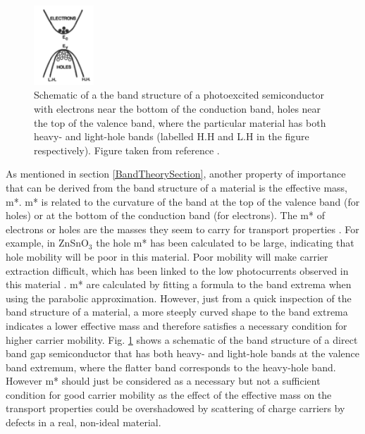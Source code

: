 \documentclass[11pt, twoside]{report}
\begin{document}
\begin{figure}[h!]
  \centering
    \includegraphics[width=0.2\textwidth]{figures/heavy_holes.png}
    \caption{Schematic of a the band structure of a photoexcited semiconductor with electrons near the bottom of the conduction band, holes near the top of the valence band, where the particular material has both heavy- and light-hole bands (labelled H.H and L.H in the figure respectively). Figure taken from reference .}
  \label{heavy_holes}
\end{figure}

As mentioned in section \ref{BandTheorySection}, another property of importance that can be derived from the band structure of a material is the effective mass, m*. m* is related to the curvature of the band at the top of the valence band (for holes) or at the bottom of the conduction band (for electrons). The m* of electrons or holes are the masses they seem to carry for transport properties \cite{dielectric_const1}. For example, in ZnSnO$_3$ the hole m* has been calculated to be large, indicating that hole mobility will be poor in this material. Poor mobility will make carrier extraction difficult, which has been linked to the low photocurrents observed in this material \cite{effective_mass1}. m* are calculated by fitting a formula to the band extrema when using the parabolic approximation. However, just from a quick inspection of the band structure of a material, a more steeply curved shape to the band extrema indicates a lower effective mass and therefore satisfies a necessary condition for higher carrier mobility. Fig. \ref{heavy_holes} shows a schematic of the band structure of a direct band gap semiconductor that has both heavy- and light-hole bands at the valence band extremum, where the flatter band corresponds to the heavy-hole band.
However m* should just be considered as a necessary but not a sufficient condition for good carrier mobility as the effect of the effective mass on the transport properties could be overshadowed by scattering of charge carriers by defects in a real, non-ideal material. 
\end{document}
